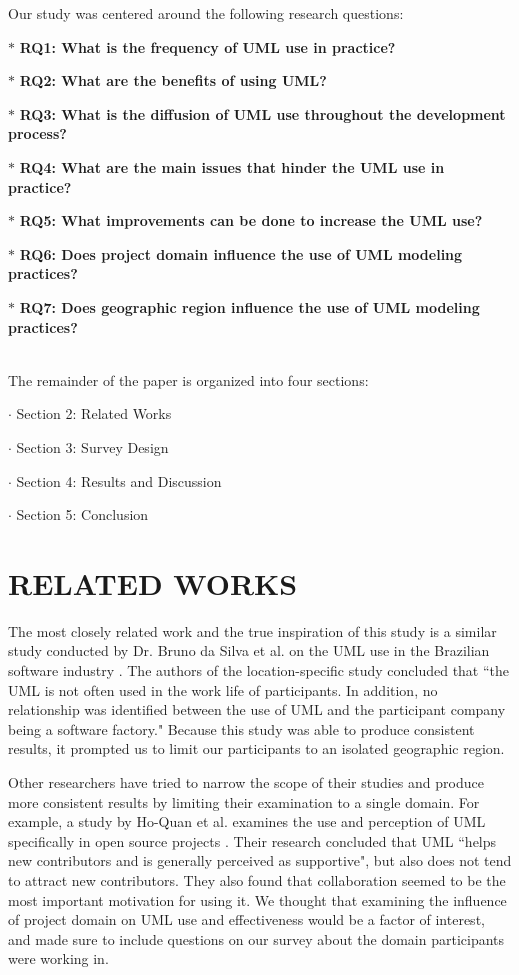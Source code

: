 \documentclass[letterpaper, 10 pt, conference]{ieeeconf}  %
\begin{document}
Our study was centered around the following research questions:

\begin{description}
  \item $\ast$ \textbf{RQ1: What is the frequency of UML use in practice?}
  \item $\ast$ \textbf{RQ2: What are the benefits of using UML?}
  \item $\ast$ \textbf{RQ3: What is the diffusion of UML use throughout the development process?}
  \item $\ast$ \textbf{RQ4: What are the main issues that hinder the UML use in practice?}
  \item $\ast$ \textbf{RQ5: What improvements can be done to increase the UML use?}
  \item $\ast$ \textbf{RQ6: Does project domain influence the use of UML modeling practices?}
  \item $\ast$ \textbf{RQ7: Does geographic region influence the use of UML modeling practices?}
\end{description}
\  \\
The remainder of the paper is organized into four sections: 
\begin{description}
  \item $\cdot$ Section 2: Related Works
  \item $\cdot$ Section 3: Survey Design
  \item $\cdot$ Section 4: Results and Discussion
  \item $\cdot$ Section 5: Conclusion
\end{description}

\section{RELATED WORKS}

The most closely related work and the true inspiration of this study is a similar  study conducted by Dr. Bruno da Silva et al. on the UML use in the Brazilian software industry \cite{c3}. The authors of the location-specific study concluded that ``the UML is not often used in the work life of participants. In addition,
no relationship was identified between the use of UML and the participant company being a software factory." Because this study was able to produce consistent results, it prompted us to limit our participants to an isolated geographic region. 

Other researchers have tried to narrow the scope of their studies and produce more consistent results by limiting their examination to a single domain. For example, a study by Ho-Quan et al. examines the use and perception of UML specifically in open source projects \cite{c6}. Their research concluded that UML ``helps new contributors and is generally perceived as supportive", but also does not tend to attract new contributors. They also found that collaboration seemed to be the most important motivation for using it. We thought that examining the influence of project domain on UML use and effectiveness would be a factor of interest, and made sure to include questions on our survey about the domain participants were working in.
\end{document}
